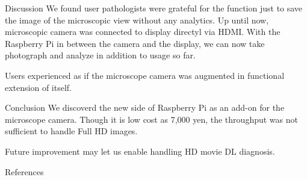 \documentclass[
  dvipdfmx,
  xcolor={svgnames},
  hyperref={colorlinks,citecolor=DeepPink4,linkcolor=DarkRed,urlcolor=DarkBlue}
  ]{beamer}
\begin{document}
\begin{frame}{Discussion}
  We found user pathologists were grateful for the function just to save the image of the microscopic view without any analytics. Up until now, microscopic camera was connected to display directyl via HDMI. With the Raspberry Pi in between the camera and the display, we can now take photograph and analyze in addition to usage so far. \par
  \vspace{0.5zh}
  Users experienced as if the microscope camera was augmented in functional extension of itself.
\end{frame}

\begin{frame}{Conclusion}
  We discoverd the new side of Raspberry Pi as an add-on for the microscope camera. Though it is low cost as 7,000 yen, the throughput was not sufficient to handle Full HD images. \par
  \vspace{0.5zh}
  Future improvement may let us enable handling HD movie DL diagnosis.
\end{frame}

\begin{frame}{References}
  \begin{figure}
    \beamertemplatetextbibitems
    
    
  \end{figure}
\end{frame}
\end{document}
